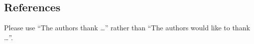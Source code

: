 \documentclass[journal=jacsat,manuscript=article]{achemso}
\begin{document}
\subsection{References}



\begin{acknowledgement}

Please use ``The authors thank \ldots'' rather than ``The
authors would like to thank \ldots''.


\end{acknowledgement}

\begin{suppinfo}


\end{suppinfo}


\end{document}
